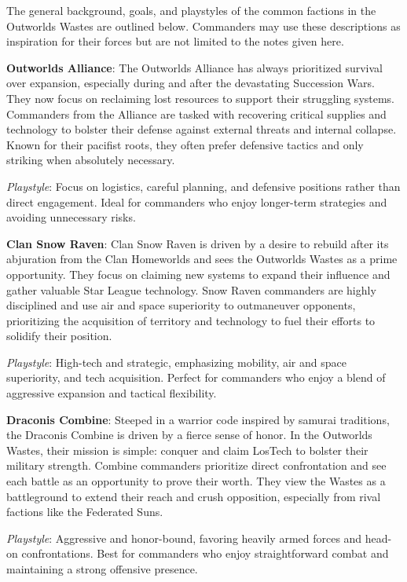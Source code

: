 The general background, goals, and playstyles of the common factions in the Outworlds Wastes are outlined below.
Commanders may use these descriptions as inspiration for their forces but are not limited to the notes given here.

{\bfseries Outworlds Alliance}:
The Outworlds Alliance has always prioritized survival over expansion, especially during and after the devastating Succession Wars.
They now focus on reclaiming lost resources to support their struggling systems.
Commanders from the Alliance are tasked with recovering critical supplies and technology to bolster their defense against external threats and internal collapse.
Known for their pacifist roots, they often prefer defensive tactics and only striking when absolutely necessary.

\emph{Playstyle}:
Focus on logistics, careful planning, and defensive positions rather than direct engagement.
Ideal for commanders who enjoy longer-term strategies and avoiding unnecessary risks.

{\bfseries Clan Snow Raven}:
Clan Snow Raven is driven by a desire to rebuild after its abjuration from the Clan Homeworlds and sees the Outworlds Wastes as a prime opportunity.
They focus on claiming new systems to expand their influence and gather valuable Star League technology.
Snow Raven commanders are highly disciplined and use air and space superiority to outmaneuver opponents, prioritizing the acquisition of territory and technology to fuel their efforts to solidify their position.

\emph{Playstyle}:
High-tech and strategic, emphasizing mobility, air and space superiority, and tech acquisition.
Perfect for commanders who enjoy a blend of aggressive expansion and tactical flexibility.

{\bfseries Draconis Combine}:
Steeped in a warrior code inspired by samurai traditions, the Draconis Combine is driven by a fierce sense of honor.
In the Outworlds Wastes, their mission is simple: conquer and claim LosTech to bolster their military strength.
Combine commanders prioritize direct confrontation and see each battle as an opportunity to prove their worth.
They view the Wastes as a battleground to extend their reach and crush opposition, especially from rival factions like the Federated Suns.

\emph{Playstyle}:
Aggressive and honor-bound, favoring heavily armed forces and head-on confrontations.
Best for commanders who enjoy straightforward combat and maintaining a strong offensive presence.

